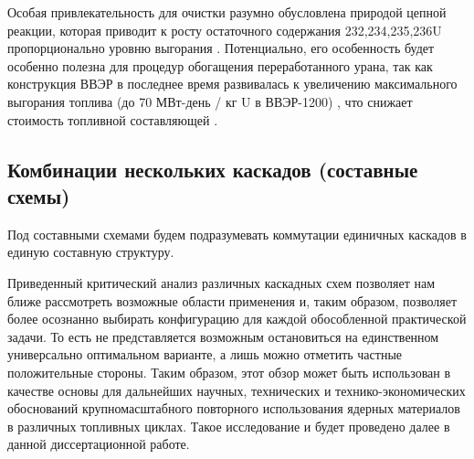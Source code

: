 Особая привлекательность для очистки разумно обусловлена природой цепной реакции, которая приводит к росту остаточного содержания 232,234,235,236U пропорционально уровню выгорания \cite{VeryHighBurnups2006}. Потенциально, его особенность будет особенно полезна для процедур обогащения переработанного урана, так как конструкция ВВЭР в последнее время развивалась к увеличению максимального выгорания топлива (до 70 МВт-день / кг U в ВВЭР-1200) \cite{asmolovNewGenerationFirstofthe2017}, что снижает стоимость топливной составляющей \cite{andrianovaPovyshenievygoraniyaToplivaVVER2008}. 

\subsection{Комбинации нескольких каскадов (составные схемы)}\label{sec:ch1/sec2.3}
Под составными схемами будем подразумевать коммутации единичных каскадов в единую составную структуру.

Приведенный критический анализ различных каскадных схем позволяет нам ближе рассмотреть возможные области применения и, таким образом, позволяет более осознанно выбирать конфигурацию для каждой обособленной практической задачи. То есть не представляется возможным остановиться на единственном универсально оптимальном варианте, а лишь можно отметить частные положительные стороны. Таким образом, этот обзор может быть использован в качестве основы для дальнейших научных, технических и технико-экономических обоснований крупномасштабного повторного использования ядерных материалов в различных топливных циклах. Такое исследование и будет проведено далее в данной диссертационной работе.


